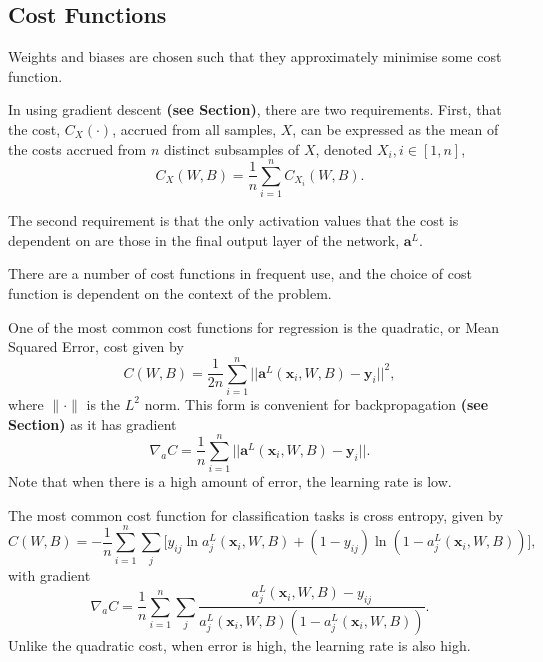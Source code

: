 \documentclass[honours,12pt]{unswthesis}
\numberwithin{equation}{section}
\begin{document}
\subsection{Cost Functions}\label{nnets-cost}

Weights and biases are chosen such that they approximately minimise some cost function.

In using gradient descent \textbf{(see Section)}, there are two requirements. First, that the cost, $C_X(\cdot)$, accrued from all samples, $X$, can be expressed as the mean of the costs accrued from $n$ distinct subsamples of $X$, denoted $X_i, i \in[1,n]$,
\[
	C_X(W, B) = \dfrac{1}{n}\sum_{i = 1}^nC_{X_i}(W,B).
\]

The second requirement is that the only activation values that the cost is dependent on are those in the final output layer of the network, $\mathbf{a}^L$.

There are a number of cost functions in frequent use, and the choice of cost function is dependent on the context of the problem.

One of the most common cost functions for regression is the quadratic, or Mean Squared Error, cost given by
\[
	C(W,B) = \dfrac{1}{2n}\sum_{i=1}^n||\mathbf{a}^L(\mathbf{x}_i,W,B) - \mathbf{y}_i ||^2,
\]
where $\|\cdot\|$ is the $L^2$ norm. This form is convenient for backpropagation \textbf{(see Section)} as it has gradient
\[
	\nabla_aC = \dfrac{1}{n}\sum_{i=1}^n||\mathbf{a}^L(\mathbf{x}_i,W,B) - \mathbf{y}_i ||.
\]
Note that when there is a high amount of error, the learning rate is low.

The most common cost function for classification tasks is cross entropy, given by
\[
	C(W,B) = -\dfrac{1}{n}\sum_{i=1}^n\sum_j\big[y_{ij}\ln a_j^L(\mathbf{x}_i,W,B) + (1 - y_{ij})\ln (1 - a_j^L(\mathbf{x}_i,W,B))\big],
\]
with gradient
\[
	\nabla_aC = \dfrac{1}{n}\sum_{i=1}^n\sum_j\dfrac{a_j^L(\mathbf{x}_i,W,B) - y_{ij}}{a_j^L(\mathbf{x}_i,W,B)(1-a_j^L(\mathbf{x}_i,W,B))}.
\]
Unlike the quadratic cost, when error is high, the learning rate is also high.

\end{document}
